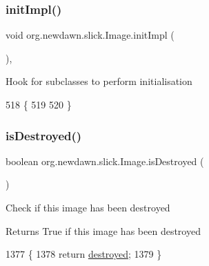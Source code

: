 \subsubsection{\texorpdfstring{init\+Impl()}{initImpl()}}
{\footnotesize\ttfamily void org.\+newdawn.\+slick.\+Image.\+init\+Impl (\begin{DoxyParamCaption}{ }\end{DoxyParamCaption})\hspace{0.3cm}{\ttfamily [inline]}, {\ttfamily [protected]}}

Hook for subclasses to perform initialisation 
\begin{DoxyCode}
518                               \{
519         
520     \}
\end{DoxyCode}
\mbox{\label{classorg_1_1newdawn_1_1slick_1_1_image_aad142bf2d948c1c32750b42f10dc5388}} 
\subsubsection{\texorpdfstring{is\+Destroyed()}{isDestroyed()}}
{\footnotesize\ttfamily boolean org.\+newdawn.\+slick.\+Image.\+is\+Destroyed (\begin{DoxyParamCaption}{ }\end{DoxyParamCaption})\hspace{0.3cm}{\ttfamily [inline]}}

Check if this image has been destroyed

\begin{DoxyReturn}{Returns}
True if this image has been destroyed 
\end{DoxyReturn}

\begin{DoxyCode}
1377                                  \{
1378         \textcolor{keywordflow}{return} \mbox{\hyperlink{classorg_1_1newdawn_1_1slick_1_1_image_a1e070cb684b88b8c22db4063b8118dcd}{destroyed}};
1379     \}
\end{DoxyCode}
\mbox{\label{classorg_1_1newdawn_1_1slick_1_1_image_a1c239bfea809dc2f4e6bafbdab613622}} 
